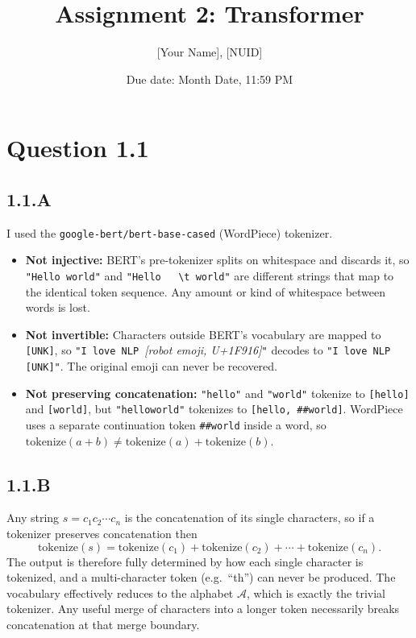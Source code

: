 \documentclass{article}
\title{Assignment 2: Transformer}
\author{[Your Name], [NUID]}
\date{Due date: Month Date, 11:59 PM}
\begin{document}
\maketitle

\section*{Question 1.1}

\subsection*{1.1.A}
I used the \texttt{google-bert/bert-base-cased} (WordPiece) tokenizer.
\begin{itemize}
  \item \textbf{Not injective:} BERT's pre-tokenizer splits on whitespace and discards it, so \texttt{"Hello world"} and \texttt{"Hello\ \ \ \textbackslash t world"} are different strings that map to the identical token sequence. Any amount or kind of whitespace between words is lost.
  \item \textbf{Not invertible:} Characters outside BERT's vocabulary are mapped to \texttt{[UNK]}, so \texttt{"I love NLP }\textit{[robot emoji, U+1F916]}\texttt{"} decodes to \texttt{"I love NLP [UNK]"}. The original emoji can never be recovered.
  \item \textbf{Not preserving concatenation:} \texttt{"hello"} and \texttt{"world"} tokenize to \texttt{[hello]} and \texttt{[world]}, but \texttt{"helloworld"} tokenizes to \texttt{[hello, \#\#world]}. WordPiece uses a separate continuation token \texttt{\#\#world} inside a word, so $\text{tokenize}(a+b) \neq \text{tokenize}(a)+\text{tokenize}(b)$.
\end{itemize}

\subsection*{1.1.B}
Any string $s = c_1 c_2 \cdots c_n$ is the concatenation of its single characters, so if a tokenizer preserves concatenation then
\[
\text{tokenize}(s) = \text{tokenize}(c_1) + \text{tokenize}(c_2) + \cdots + \text{tokenize}(c_n).
\]
The output is therefore fully determined by how each single character is tokenized, and a multi-character token (e.g.\ ``th'') can never be produced. The vocabulary effectively reduces to the alphabet $\mathcal{A}$, which is exactly the trivial tokenizer. Any useful merge of characters into a longer token necessarily breaks concatenation at that merge boundary.
\end{document}
